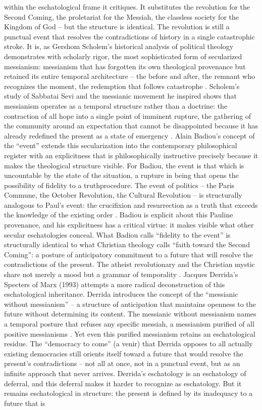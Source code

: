 within the eschatological frame it critiques. It substitutes the revolution for the Second Coming, the proletariat for the Messiah, the classless society for the Kingdom of God – but the structure is identical. The revolution is still a punctual event that resolves the contradictions of history in a single catastrophic stroke. It is, as Gershom Scholem’s historical analysis of political theology demonstrates with scholarly rigor, the most sophisticated form of secularized messianism: messianism that has forgotten its own theological provenance but retained its entire temporal architecture – the before and after, the remnant who recognizes the moment, the redemption that follows catastrophe \cite[pp.~1-36]{scholem_1971}. Scholem’s study of Sabbatai Sevi and the messianic movement he inspired shows that messianism operates as a temporal structure rather than a doctrine: the contraction of all hope into a single point of imminent rupture, the gathering of the community around an expectation that cannot be disappointed because it has already redefined the present as a state of emergency \cite[pp.~1-50]{scholem_1973}. Alain Badiou’s concept of the “event” extends this secularization into the contemporary philosophical register with an explicitness that is philosophically instructive precisely because it makes the theological structure visible. For Badiou, the event is that which is uncountable by the state of the situation, a rupture in being that opens the possibility of fidelity to a truthprocedure. The event of politics – the Paris Commune, the October Revolution, the Cultural Revolution – is structurally analogous to Paul’s event: the crucifixion and resurrection as a truth that exceeds the knowledge of the existing order \cite[pp.~1-15]{badiou_1997}. Badiou is explicit about this Pauline provenance, and his explicitness has a critical virtue: it makes visible what other secular eschatologies conceal. What Badiou calls “fidelity to the event” is structurally identical to what Christian theology calls “faith toward the Second Coming”: a posture of anticipatory commitment to a future that will resolve the contradictions of the present. The atheist revolutionary and the Christian mystic share not merely a mood but a grammar of temporality \cite[pp.~173-208]{badiou_1988}. Jacques Derrida’s Specters of Marx (1993) attempts a more radical deconstruction of this eschatological inheritance. Derrida introduces the concept of the “messianic without messianism” – a structure of anticipation that maintains openness to the future without determining its content. The messianic without messianism names a temporal posture that refuses any specific messiah, a messianism purified of all positive messianisms \cite[pp.~167-169]{derrida_1993}. Yet even this purified messianism retains an eschatological residue. The “democracy to come” (a venir) that Derrida opposes to all actually existing democracies still orients itself toward a future that would resolve the present’s contradictions – not all at once, not in a punctual event, but as an infinite approach that never arrives. Derrida’s eschatology is an eschatology of deferral, and this deferral makes it harder to recognize as eschatology. But it remains eschatological in structure: the present is defined by its inadequacy to a future that is 